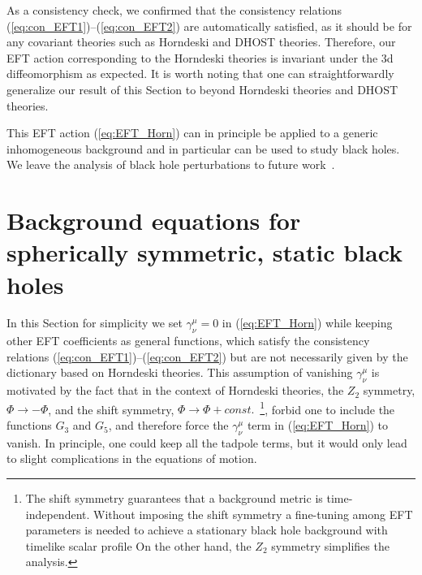 \documentclass[a4paper,11pt]{article}
\numberwithin{equation}{section}
\begin{document}
As a consistency check, we confirmed that the consistency relations (\ref{eq:con_EFT1})--(\ref{eq:con_EFT2}) are automatically satisfied, as it should be for any covariant theories such as Horndeski and DHOST theories. Therefore, our EFT action corresponding to the Horndeski theories is invariant under the 3d diffeomorphism as expected. It is worth noting that one can straightforwardly generalize our result of this Section to beyond Horndeski theories and DHOST theories.

This EFT action (\ref{eq:EFT_Horn}) can in principle be applied to a generic inhomogeneous background and in particular can be used to study black holes. We leave the analysis of black hole perturbations to future work~\cite{Mukohyama:2022skv}.  


\section{Background equations for spherically symmetric, static black holes}\label{sec:bg_tadpole}
In this Section for simplicity we set $\gamma^\mu_\nu=0$ in (\ref{eq:EFT_Horn}) while keeping other EFT coefficients as general functions, which satisfy the consistency relations (\ref{eq:con_EFT1})--(\ref{eq:con_EFT2}) but are not necessarily given by the dictionary based on Horndeski theories. This assumption of vanishing $\gamma^\mu_\nu$ is motivated by the fact that in the context of Horndeski theories, the $Z_2$ symmetry, $\Phi \rightarrow -\Phi$, and the shift symmetry, $\Phi \rightarrow \Phi + const.$~\footnote{The shift symmetry guarantees that a background metric is time-independent. Without imposing the shift symmetry a fine-tuning among EFT parameters is needed to achieve a stationary black hole background with timelike scalar profile On the other hand, the $Z_2$ symmetry simplifies the analysis.}, forbid one to include the functions $G_3$ and $G_5$, and therefore force the $\gamma^\mu_\nu$ term in (\ref{eq:EFT_Horn}) to vanish. In principle, one could keep all the tadpole terms, but it would only lead to slight complications in the equations of motion.
\end{document}
